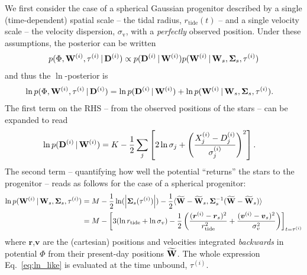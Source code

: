 \documentclass[letterpaper,12pt,preprint]{aastex}
\newcommand{\given}{\,|\,}
\newcommand{\D}{{\bf D}}
\newcommand{\W}{{\bf W}}
\newcommand{\bSigma}{{\bf \Sigma}}
\begin{document}
We first consider the case of a spherical Gaussian progenitor described by a single (time-dependent) spatial scale -- the tidal radius, $r_{\mathrm{tide}}(t)$ -- and a single velocity scale -- the velocity dispersion, $\sigma_\mathrm{v}$, with a \emph{perfectly} observed position. Under these assumptions, the posterior can be written
\begin{align}
	p(\Phi, \W^{(i)}, \tau^{(i)} \given \D^{(i)}) &\propto 
		p(\D^{(i)} \given \W^{(i)}) p(\W^{(i)} \given \W_s, \bSigma_s, \tau^{(i)})\\
\end{align}
and thus the $\ln$-posterior is
\begin{align}
	\ln p(\Phi, \W^{(i)}, \tau^{(i)} \given \D^{(i)}) &= \ln p(\D^{(i)} \given \W^{(i)}) + \ln p(\W^{(i)} \given \W_s, \bSigma_s, \tau^{(i)}).
\end{align}
The first term on the RHS -- from the observed positions of the stars	-- can be expanded to read
\begin{align}
	\ln p(\D^{(i)} \given \W^{(i)}) &= K - \frac{1}{2}\sum_j \left[ 2\ln\sigma_j + \left(\frac{X^{(i)}_j-D^{(i)}_j}{\sigma^{(i)}_j}\right)^2\right].
\end{align}
The second term -- quantifying how well the potential ``returns'' the stars to the progenitor -- reads as follows for the case of a spherical progenitor:
\begin{align}
	\ln p(\W^{(i)} \given \W_s, \bSigma_s, \tau^{(i)}) &= M - \frac{1}{2}\ln(\left\vert\bSigma_s(\tau^{(i)})\right\vert) - \frac{1}{2}\langle \widetilde{\W}-\widetilde{\W}_s, \bSigma_s^{-1}(\widetilde{\W}-\widetilde{\W}_s) \rangle\\
	&= M - \left[3(\ln r_{\rm tide} + \ln \sigma_v) - \frac{1}{2}\left( \frac{({\boldsymbol r}^{(i)}-{\boldsymbol r}_s)^2}{r_{\rm tide}^2} + \frac{ ({\boldsymbol v}^{(i)}-{\boldsymbol v}_s)^2}{\sigma_v^2} \right)\right]_{t=\tau^{(i)}}\label{eq:ln_like}
\end{align}
where $\boldsymbol r$,$\boldsymbol v$ are the (cartesian) positions and velocities integrated \emph{backwards} in potential $\Phi$ from their present-day positions $\widetilde{\W}$. The whole expression Eq.~\ref{eq:ln_like} is evaluated at the time unbound, $\tau^{(i)}$.

\end{document}
